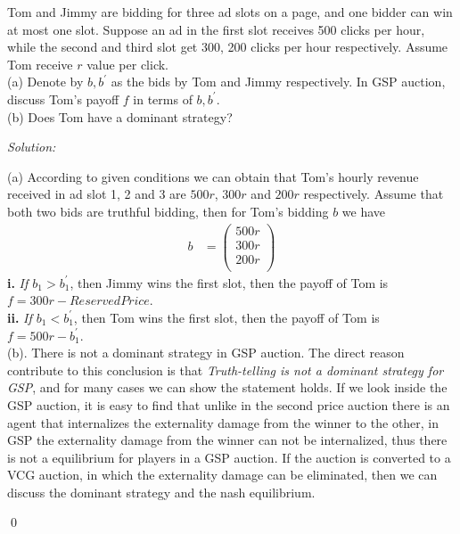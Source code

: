 \documentclass[12pt]{article}
\newenvironment{problem}[2][Problem]{\begin{trivlist}
\item[\hskip \labelsep {\bfseries #1}\hskip \labelsep {\bfseries #2.}]}{\end{trivlist}}
\newenvironment{sol}
    {\emph{Solution:}
    }
    {
    \qed
    }
\begin{document}
\begin{problem}{3}
	Tom and Jimmy are bidding for three ad slots on a page, and one bidder can win at most one slot. Suppose an ad in the first slot receives 500 clicks per hour, while the second and third slot get 300, 200 clicks per hour respectively. Assume Tom receive $r$ value per click. \\
	(a) Denote by $b, b^\prime$ as the bids by Tom and Jimmy respectively. In GSP auction, discuss Tom's payoff $ f $ in terms of $ b, b^\prime $.\\
	(b) Does Tom have a dominant strategy?
\end{problem}
\begin{sol}
	(a) According to given conditions we can obtain that Tom's hourly revenue received in ad slot 1, 2 and 3 are $500r$, $300r$ and $200r$ respectively. Assume that both two bids are truthful bidding, then for Tom's bidding $b$ we have 
	\begin{align*}
		b &= \begin{pmatrix}
		500r \\ 300r \\ 200r \\
		\end{pmatrix}
	\end{align*}
	\textbf{i.} \textit{If $b_1 > b_1^\prime$}, then Jimmy wins the first slot, then the payoff of Tom is $f = 300r - \textit{ReservedPrice}$. \\
	\textbf{ii.} \textit{If $b_1 < b_1^\prime$}, then Tom wins the first slot, then the payoff of Tom is $f = 500r - b_1^\prime$.\\
	(b). There is not a dominant strategy in GSP auction. The direct reason contribute to this conclusion is that \textit{Truth-telling is not a dominant strategy for GSP}, and for many cases we can show the statement holds. If we look inside the GSP auction, it is easy to find that unlike in the second price auction there is an agent that internalizes the externality damage from the winner to the other, in GSP the externality damage from the winner can not be internalized, thus there is not a equilibrium for players in a GSP auction. If the auction is converted to a VCG auction, in which the externality damage can be eliminated, then we can discuss the dominant strategy and the nash equilibrium. 
\end{sol}
\end{document}

